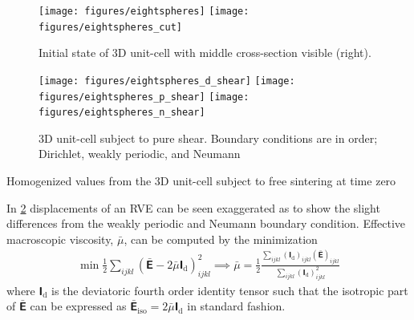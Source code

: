 \documentclass[12pt,a4paper]{article}
\renewcommand{\tf}[1]{\mathbfsfup{#1}}
\renewcommand{\dev}{\mathrm{d}}
\begin{document}
\begin{figure}[H]
 \centering
 \texttt{[image: figures/eightspheres]}
 \texttt{[image: figures/eightspheres\_cut]}
 \caption{Initial state of 3D unit-cell with middle cross-section visible (right).}
 \label{fig:rve_3d}
\end{figure}


\begin{figure}[H]
 \centering
 \texttt{[image: figures/eightspheres\_d\_shear]}
 \texttt{[image: figures/eightspheres\_p\_shear]}
 \texttt{[image: figures/eightspheres\_n\_shear]}
 \caption{3D unit-cell subject to pure shear. Boundary conditions are in order; Dirichlet, weakly periodic, and Neumann}
 \label{fig:rve_3d_deformed}
\end{figure}

\begin{table}[H]
 \centering



 \caption{Homogenized values from the 3D unit-cell subject to free sintering at time zero}
 \label{tab:rve_3d_homog}
\end{table}



In \cref{fig:rve_3d_deformed} displacements of an RVE can be seen exaggerated as to show the slight differences from the weakly periodic and Neumann boundary condition.
Effective macroscopic viscosity, $\bar{\mu}$, can be computed by the minimization
\begin{align}
 \min \frac12 \sum_{ijkl} (\bar{\tf E} - 2 \bar{\mu} \tf I_\dev)_{ijkl}^2 \implies \bar{\mu} = \frac12 \frac{\sum_{ijkl}(\tf I_\dev)_{ijkl}(\bar{\tf E})_{ijkl}}{\sum_{ijkl} (\tf I_\dev)_{ijkl}^2}
\end{align}
where $\tf I_\dev$ is the deviatoric fourth order identity tensor such that the isotropic part of $\bar{\tf E}$ can be expressed as $\bar{\tf E}_{\mathrm{iso}} = 2 \bar{\mu} \tf I_\dev$ in standard fashion.
\end{document}
